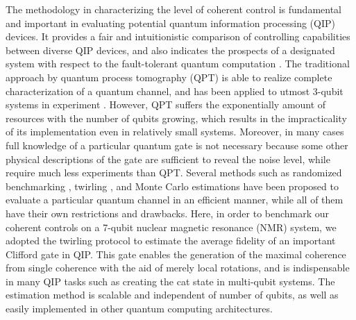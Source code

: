\documentclass[prl,twocolumn,showpacs]{revtex4-1}
\begin{document}
The methodology in characterizing the level of coherent control is fundamental and important in evaluating potential quantum information processing (QIP) devices. It provides a fair and intuitionistic comparison of controlling capabilities between diverse QIP devices, and also indicates the prospects of a designated system with respect to the fault-tolerant quantum computation \cite{Preskill1998}. The traditional approach by quantum process tomography (QPT) \cite{Chuang1997,Poyatos1997} is able to realize complete characterization of a quantum channel, and has been applied to utmost 3-qubit systems in experiment \cite{Childs2001,Weinstein2004,Brien2004,Riebe2006,Chow2009,Bialczak2010,Kim2014}. However, QPT suffers the exponentially amount of resources with the number of qubits growing, which results in the impracticality of its implementation even in relatively small systems. Moreover, in many cases full knowledge of a particular quantum gate is not necessary because some other physical descriptions of the gate are sufficient to reveal the noise level, while require much less experiments than QPT.  Several methods such as randomized benchmarking \cite{Emerson2005,Knill2008,Ryan2009}, twirling \cite{Emerson2007,Dankert2009,Moussa2012}, and Monte Carlo estimations \cite{Flammia2011,Silva2011} have been proposed to evaluate a particular quantum channel in an efficient manner, while all of them have their own restrictions and drawbacks. Here, in order to benchmark our coherent controls on a 7-qubit nuclear magnetic resonance (NMR) system, we adopted the twirling protocol \cite{Moussa2012} to estimate the average fidelity of an important Clifford gate in QIP. This gate enables the generation of the maximal coherence from single coherence with the aid of merely local rotations, and is indispensable in many QIP tasks such as creating the cat state in multi-qubit systems. The estimation method is scalable and independent of number of qubits, as well as easily implemented in other quantum computing architectures.
\end{document}
